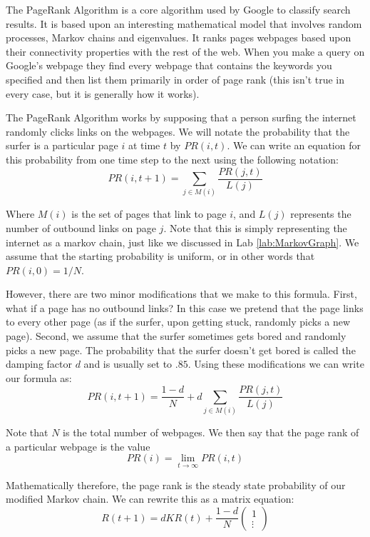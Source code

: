 \label{lab:page_rank}


The PageRank Algorithm is a core algorithm used by Google to classify search results.
It is based upon an interesting mathematical model that involves random processes, Markov chains and eigenvalues.
It ranks pages webpages based upon their connectivity properties with the rest of the web.
When you make a query on Google's webpage they find every webpage that contains the keywords you specified and then list them primarily in order of page rank (this isn't true in every case, but it is generally how it works).

The PageRank Algorithm works by supposing that a person surfing the internet randomly clicks links on the webpages.
We will notate the probability that the surfer is a particular page $i$ at time $t$ by $PR(i,t)$.
We can write an equation for this probability from one time step to the next using the following notation:
\[PR(i,t+1) = \sum_{j \in M(i)} \frac{PR(j,t)}{L(j)}\]

Where $M(i)$ is the set of pages that link to page $i$, and $L(j)$ represents the number of outbound links on page $j$.
Note that this is simply representing the internet as a markov chain, just like we discussed in Lab \ref{lab:MarkovGraph}.
We assume that the starting probability is uniform, or in other words that $PR(i,0) = 1/N$.

However, there are two minor modifications that we make to this formula.
First, what if a page has no outbound links?
In this case we pretend that the page links to every other page (as if the surfer, upon getting stuck, randomly picks a new page).
Second, we assume that the surfer sometimes gets bored and randomly picks a new page.
The probability that the surfer doesn't get bored is called the damping factor $d$ and is usually set to $.85$.
Using these modifications we can write our formula as:
\[PR(i,t+1) = \frac{1-d}{N} + d\sum_{j \in M(i)} \frac{PR(j,t)}{L(j)}\]

Note that $N$ is the total number of webpages.
We then say that the page rank of a particular webpage is the value
\[PR(i) = \lim_{t\to \infty} PR(i,t)\]

Mathematically therefore, the page rank is the steady state probability of our modified Markov chain.
We can rewrite this as a matrix equation:
\[R(t+1) = d K R(t) + \frac{1-d}{N} \begin{pmatrix}1\\\vdots\end{pmatrix}\]

